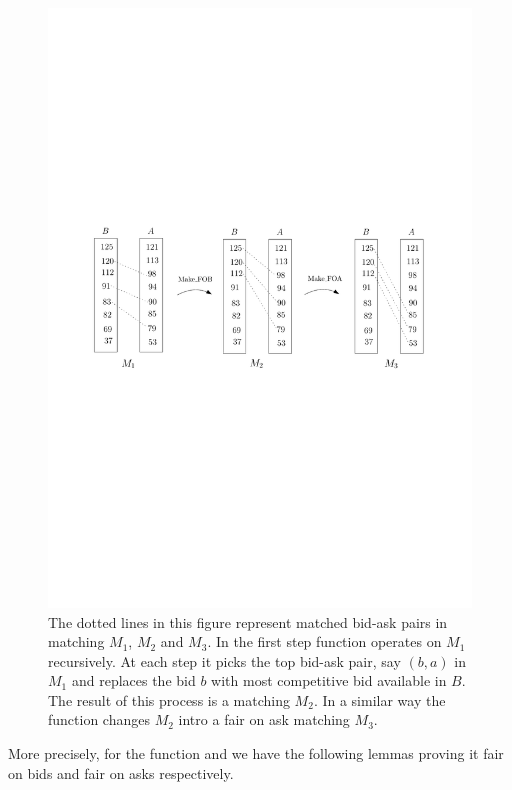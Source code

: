 \documentclass[a4paper,UKenglish,cleveref, autoref]{lipics-v2019}
\begin{document}
\begin{figure}[h!]
\centering
\includegraphics[width=.8\textwidth]{make_fair.pdf}
\caption{The dotted lines in this figure represent  matched bid-ask pairs in  matching $M_1$, $M_2$ and $M_3$. In the first step function  operates on $M_1$ recursively. At each step it picks the top bid-ask pair, say $(b,a)$ in $M_1$ and replaces the bid  $b$ with most competitive bid available in $B$. The result of this process is a  matching $M_2$. In a similar way the function  changes $M_2$ intro a fair on ask matching $M_3$.  }
\label{fig:fair}
\end{figure}

More precisely, for the function  and  we have the following lemmas proving it fair on bids and fair on asks respectively. 
\begin{lemma}\label{lem:fob}
\end{lemma}

\begin{lemma}\label{lem:foa}
\end{lemma}
\end{document}
